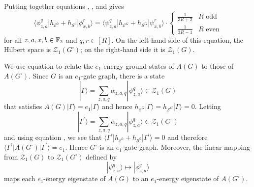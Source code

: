 \documentclass[../thesis-main/thesis-main]{subfiles}
\begin{document}
Putting together equations , , and  gives
\begin{equation}
  \langle\phi_{z,a}^{q}|h_{\mathcal{E}^{0}}+h_{\mathcal{S}^{0}}|\phi_{x,b}^{r}\rangle=\langle\psi_{z,a}^{q}|h_{\mathcal{E}^{G}}+h_{\mathcal{S}^{G}}|\psi_{x,b}^{r}\rangle\cdot
  \begin{cases}
    \frac{1}{3R+2} & R\text{ odd}\\
    \frac{1}{3R-1} & R\text{ even}
  \end{cases}
  \label{eq:h_eG_hsG}
\end{equation}
for all $z,a,x,b\in\mathbb{F}_2$ and $q,r\in[R]$. On the left-hand side of this equation, the Hilbert space is $\mathcal{Z}_{1}(G^{\square})$; on the right-hand side it is $\mathcal{Z}_{1}(G)$.

We use equation  to relate the $e_1$-energy ground states of $A(G)$ to those of $A(G^\square)$. Since $G$ is an $e_{1}$-gate graph, there is a state 
\begin{equation}
  |\Gamma\rangle=\sum_{z,a,q}\alpha_{z,a,q}|\psi_{z,a}^{q}\rangle\in\mathcal{Z}_{1}(G)
\end{equation}
that satisfies $A(G)|\Gamma\rangle=e_1|\Gamma\rangle$ and hence $h_{\mathcal{E}^{G}}|\Gamma\rangle=h_{\mathcal{S}^{G}}|\Gamma\rangle=0$. Letting
\begin{equation}
  |\Gamma^{\prime}\rangle=\sum_{z,a,q}\alpha_{z,a,q}|\phi_{z,a}^{q}\rangle\in\mathcal{Z}_{1}(G^{\square})
\end{equation}
and using equation , we see that $\langle\Gamma^{\prime}|h_{\mathcal{E}^{0}}+h_{\mathcal{S}^{0}}|\Gamma^{\prime}\rangle=0$ and therefore $\langle\Gamma^{\prime}|A(G^{\square})|\Gamma^{\prime}\rangle=e_{1}$. Hence $G^{\square}$ is an $e_{1}$-gate graph. Moreover, the linear mapping from $\mathcal{Z}_{1}(G)$ to $\mathcal{Z}_{1}(G^\square)$ defined by
\begin{equation}
  |\psi_{z,a}^{q}\rangle \mapsto |\phi_{z,a}^{q}\rangle\label{eq:map_1particle}
\end{equation}
maps each $e_{1}$-energy eigenstate of $A(G)$ to an $e_{1}$-energy eigenstate of $A(G^{\square})$.
\end{document}

